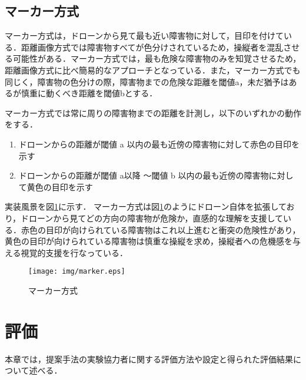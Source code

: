 \documentclass
[a4paper,11pt]{jreport}
\begin{document}
\section{マーカー方式}
マーカー方式は，ドローンから見て最も近い障害物に対して，目印を付けている．距離画像方式では障害物すべてが色分けされているため，操縦者を混乱させる可能性がある．マーカー方式では，最も危険な障害物のみを知覚させるため，距離画像方式に比べ簡易的なアプローチとなっている．また，マーカー方式でも同じく，障害物の色分けの際，障害物までの危険な距離を閾値a，未だ猶予はあるが慎重に動くべき距離を閾値bとする．
\par
マーカー方式では常に周りの障害物までの距離を計測し，以下のいずれかの動作をする．
\begin{enumerate}
	\item ドローンからの距離が閾値 a 以内の最も近傍の障害物に対して赤色の目印を示す
    
    \item ドローンからの距離が閾値 a以降 〜閾値 b 以内の最も近傍の障害物に対して黄色の目印を示す
\end{enumerate}
実装風景を図\ref{tab:marker}に示す．
マーカー方式は図\ref{tab:marker}のようにドローン自体を拡張しており，ドローンから見てどの方向の障害物が危険か，直感的な理解を支援している．赤色の目印が向けられている障害物はこれ以上進むと衝突の危険性があり，黄色の目印が向けられている障害物は慎重な操縦を求め，操縦者への危機感を与える視覚的支援を行なっている．

\begin{figure}[bt]
	\begin{center}
    \texttt{[image: img/marker.eps]}
    \caption{マーカー方式}
    \label{tab:marker}
    \end{center}
\end{figure}


\chapter{評価}

本章では，提案手法の実験協力者に関する評価方法や設定と得られた評価結果について述べる．

\end{document}
